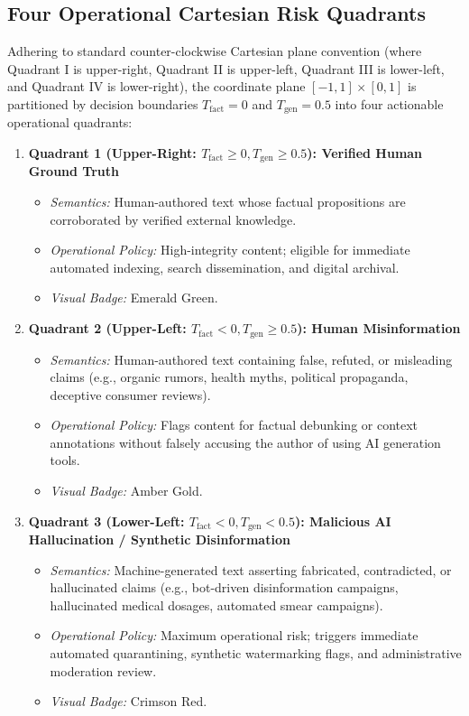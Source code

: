 \subsection{Four Operational Cartesian Risk Quadrants}
Adhering to standard counter-clockwise Cartesian plane convention (where Quadrant I is upper-right, Quadrant II is upper-left, Quadrant III is lower-left, and Quadrant IV is lower-right), the coordinate plane $[-1, 1] \times [0, 1]$ is partitioned by decision boundaries $T_{\text{fact}} = 0$ and $T_{\text{gen}} = 0.5$ into four actionable operational quadrants:
\begin{enumerate}
    \item \textbf{Quadrant 1 (Upper-Right: $T_{\text{fact}} \ge 0, T_{\text{gen}} \ge 0.5$): Verified Human Ground Truth}
    \begin{itemize}
        \item \textit{Semantics:} Human-authored text whose factual propositions are corroborated by verified external knowledge.
        \item \textit{Operational Policy:} High-integrity content; eligible for immediate automated indexing, search dissemination, and digital archival.
        \item \textit{Visual Badge:} Emerald Green.
    \end{itemize}
    
    \item \textbf{Quadrant 2 (Upper-Left: $T_{\text{fact}} < 0, T_{\text{gen}} \ge 0.5$): Human Misinformation}
    \begin{itemize}
        \item \textit{Semantics:} Human-authored text containing false, refuted, or misleading claims (e.g., organic rumors, health myths, political propaganda, deceptive consumer reviews).
        \item \textit{Operational Policy:} Flags content for factual debunking or context annotations without falsely accusing the author of using AI generation tools.
        \item \textit{Visual Badge:} Amber Gold.
    \end{itemize}
    
    \item \textbf{Quadrant 3 (Lower-Left: $T_{\text{fact}} < 0, T_{\text{gen}} < 0.5$): Malicious AI Hallucination / Synthetic Disinformation}
    \begin{itemize}
        \item \textit{Semantics:} Machine-generated text asserting fabricated, contradicted, or hallucinated claims (e.g., bot-driven disinformation campaigns, hallucinated medical dosages, automated smear campaigns).
        \item \textit{Operational Policy:} Maximum operational risk; triggers immediate automated quarantining, synthetic watermarking flags, and administrative moderation review.
        \item \textit{Visual Badge:} Crimson Red.
    \end{itemize}
    

\end{enumerate}
